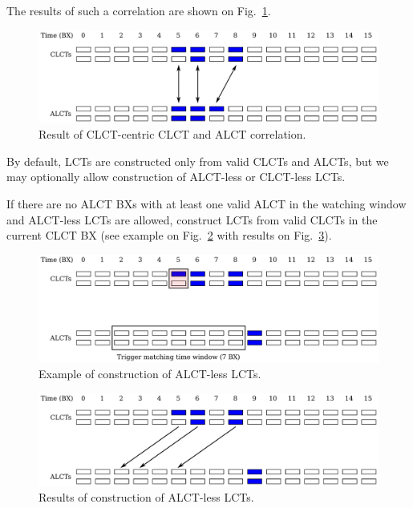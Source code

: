 The results of such a correlation are shown on Fig.~\ref{fig:clct_alcts_end}.

\begin{figure}[tbh]
        \begin{center}
                \includegraphics[width=0.7\linewidth]{figures/clct_alcts_end.pdf}
                \caption{Result of CLCT-centric CLCT and ALCT correlation.}
                \label{fig:clct_alcts_end}
        \end{center}
\end{figure}

By default, LCTs are constructed only from valid CLCTs and ALCTs, but we may optionally allow construction of ALCT-less or CLCT-less LCTs.

If there are no ALCT BXs with at least one valid ALCT in the watching window and ALCT-less LCTs are allowed, construct LCTs from valid CLCTs in the current CLCT BX (see example on Fig.~\ref{fig:clct_alcts_alctless} with results on Fig.~\ref{fig:clct_alcts_alctless_end}).

\begin{figure}[tbh]
        \begin{center}
                \includegraphics[width=0.7\linewidth]{figures/clct_alcts_alctless.pdf}
                \caption{Example of construction of ALCT-less LCTs.}
                \label{fig:clct_alcts_alctless}
        \end{center}
\end{figure}

\begin{figure}[tbh]
        \begin{center}
                \includegraphics[width=0.7\linewidth]{figures/clct_alcts_alctless_end.pdf}
                \caption{Results of construction of ALCT-less LCTs.}
                \label{fig:clct_alcts_alctless_end}
        \end{center}
\end{figure}

